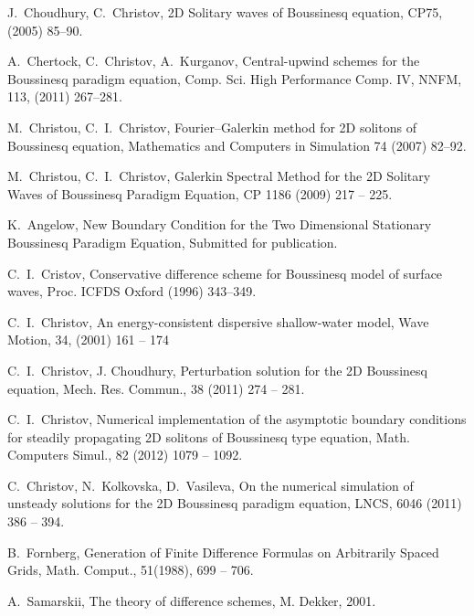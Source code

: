 \documentclass[leqno,11pt]{book}
\def\bibname{\rm R\,E\,F\,E\,R\,E\,N\,C\,E\,S} %
\begin{document}
\frenchspacing
\def\bibname{\rm R\,E\,F\,E\,R\,E\,N\,C\,E\,S}
\begin{thebibliography}{30}
J.~Choudhury, C.~Christov, 2D  Solitary waves of  Boussinesq equation, CP75, (2005) 85–90.

A.~Chertock, C.~Christov, A.~Kurganov, Central-upwind schemes for the  Boussinesq paradigm equation, Comp. Sci. High Performance Comp. IV, NNFM, 113, (2011) 267–281.

M.~Christou, C.~I.~Christov, Fourier–Galerkin method for 2D solitons of Boussinesq equation, 
Mathematics and Computers in Simulation 74 (2007) 82–92.
 
M.~Christou, C.~I.~Christov, Galerkin Spectral Method for the 2D Solitary
Waves of Boussinesq Paradigm Equation, CP 1186 (2009) 217 -- 225.

K.~Angelow, New Boundary Condition for the Two Dimensional Stationary Boussinesq Paradigm Equation, 
Submitted for publication.

C.~I.~Cristov, Conservative difference scheme for Boussinesq model of
surface waves, Proc. ICFDS Oxford (1996) 343--349.

C.~I.~Christov, An energy-consistent dispersive shallow-water model,
Wave Motion,  34, (2001) 161 -- 174


C.~I.~Christov, J. Choudhury, Perturbation solution  for the 2D Boussinesq equation,       
Mech. Res. Commun., 38 (2011)  274 -- 281.

C.~I.~Christov,  Numerical implementation of the asymptotic boundary conditions
for steadily propagating 2D solitons of   Boussinesq type equation,       
Math. Computers  Simul., 82 (2012)  1079 -- 1092.

C.~Christov, N.~Kolkovska, D.~Vasileva, On the numerical simulation of unsteady solutions for the 2D Boussinesq paradigm equation, LNCS, 6046  (2011) 386 -- 394.

B.~Fornberg, Generation of Finite Difference Formulas on Arbitrarily Spaced Grids, 
Math. Comput., 51(1988),  699 -- 706.

A.~Samarskii, The theory of difference schemes, M. Dekker,  2001.

\end{thebibliography}
\end{document}
